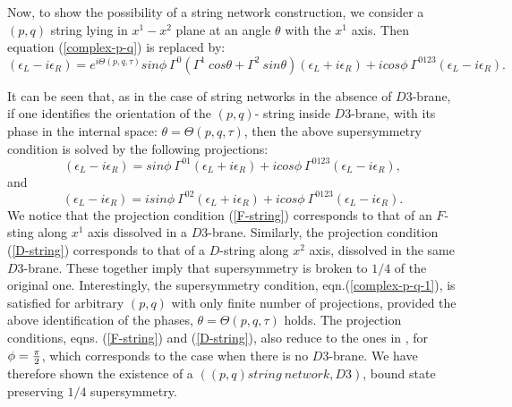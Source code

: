 \documentclass[a4paper,12pt]{article}
\begin{document}
Now, to show the possibility of a string network construction, 
we consider a $(p, q)$ string lying in $x^1 - x^2$ plane at an angle 
$\theta$ with the $x^1$ axis. Then equation (\ref{complex-p-q}) is 
replaced by:
\begin{equation}
(\epsilon_L - i \epsilon_R) = e^{i \Theta{(p, q, \tau)}} 
             sin\phi ~\Gamma^{0}(\Gamma^1 ~cos\theta + \Gamma^2 ~sin\theta) 
              (\epsilon_L + i \epsilon_R) + 
           i cos\phi ~\Gamma^{0 1 2 3} (\epsilon_L - i \epsilon_R).
\label{complex-p-q-1}
\end{equation}

It can be seen that, as in the case of string networks in the absence
of $D3$-brane,  
if one identifies the orientation of the $(p, q)$-
string inside $D3$-brane, with its phase in the internal space:
$\theta = \Theta(p, q, \tau)$, then the above supersymmetry 
condition is solved by the following projections:
\begin{equation}
(\epsilon_L - i \epsilon_R) =  sin\phi ~\Gamma^{0 1} 
              (\epsilon_L + i \epsilon_R) + 
           i cos\phi ~\Gamma^{0 1 2 3} (\epsilon_L - i \epsilon_R),
\label{F-string}
\end{equation}
and
\begin{equation}
(\epsilon_L - i \epsilon_R) = i sin\phi ~\Gamma^{0 2} 
              (\epsilon_L + i \epsilon_R) + 
           i cos\phi ~\Gamma^{0 1 2 3} (\epsilon_L - i \epsilon_R).
\label{D-string}
\end{equation}
We notice that the projection condition (\ref{F-string}) corresponds
to that of an $F$-sting along $x^1$ axis dissolved in a $D3$-brane. 
Similarly, the projection condition
(\ref{D-string}) corresponds to that of a $D$-string along $x^2$ 
axis, dissolved in the same $D3$-brane. These together imply that
supersymmetry is broken to $1/4$ of the original one. Interestingly, 
the supersymmetry condition, eqn.(\ref{complex-p-q-1}), 
is satisfied for arbitrary $(p, q)$ with 
only finite number of projections, provided the above identification
of the phases, $\theta = \Theta(p, q, \tau)$ holds. 
The projection conditions, eqns. (\ref{F-string}) 
and (\ref{D-string}), also reduce to the ones in \cite{sen}, for 
$\phi = {\pi \over 2}$, which corresponds to the case when 
there is no $D3$-brane.  
We have therefore shown the existence of a 
$((p, q) string~network, D3)$,  bound state preserving $1/4$ 
supersymmetry. 
\end{document}
